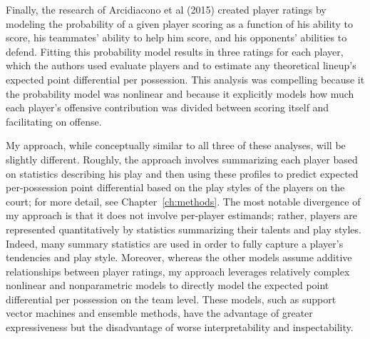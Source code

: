 Finally, the research of Arcidiacono et al (2015) created player ratings by modeling
the probability of a given player scoring as a function of his ability to score, his
teammates' ability to help him score, and his opponents' abilities to defend.
Fitting this probability model results in three ratings for each player, which the
authors used evaluate players and to estimate any theoretical lineup's expected
point differential per possession. This analysis was compelling because it the
probability model was nonlinear and because it explicitly models how much each
player's offensive contribution was divided between scoring itself and facilitating
on offense.

My approach, while conceptually similar to all three of these analyses, will be
slightly different. Roughly, the approach involves summarizing each player based on
statistics describing his play and then using these profiles to predict expected
per-possession point differential based on the play styles of the players on the
court; for more detail, see Chapter~\ref{ch:methods}. The most notable divergence of
my approach is that it does not involve per-player estimands; rather, players are
represented quantitatively by statistics summarizing their talents and play styles.
Indeed, many summary statistics are used in order to fully capture a player's
tendencies and play style. Moreover, whereas the other models assume additive
relationships between player ratings, my approach leverages relatively complex
nonlinear and nonparametric models to directly model the expected point
differential per possession on the team level. These models, such as support vector
machines and ensemble methods, have the advantage of greater expressiveness but the
disadvantage of worse interpretability and inspectability.

